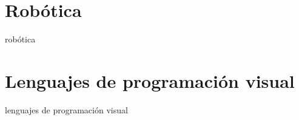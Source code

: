 \section{Robótica}
\label{sec:robotica}

robótica

\section{Lenguajes de programación visual}
\label{sec:lenguajes}

lenguajes de programación visual
